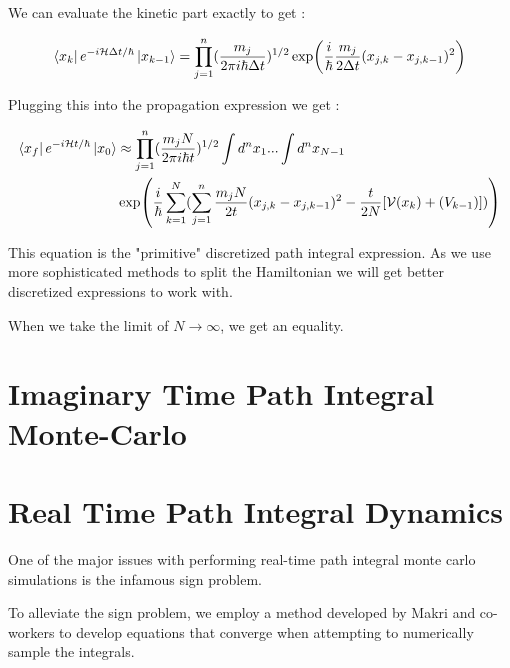 We can evaluate the kinetic part exactly to get :

\begin{equation} \label{4.x}
\bra{x_k}e^{-i\mathcal{H} \Delta t/\hbar}\ket{x_{k-1}} = \prod_{j=1}^{n} (\frac{m_j}{2\pi i \hbar \Delta t})^{1/2} \exp(\frac{i}{\hbar} \frac{m_j}{2\Delta t} (x_{j,k} - x_{j, k-1})^2)
\end{equation}

Plugging this into the propagation expression we get :

\begin{equation} \label{4.x}
    \begin{split}
        \bra{x_f} e^{-i\mathcal{H}t/\hbar} \ket{x_0} & \approx \prod_{j=1}^{n} (\frac{m_j N}{2\pi i \hbar t})^{1/2}  \int d^n x_1 ... \int d^n x_{N-1} \\ & \exp(\frac{i}{\hbar} \sum_{k=1}^{N} (\sum_{j=1}^{n} \frac{m_j N}{2t} (x_{j,k} - x_{j, k-1})^2 - \frac{t}{2N}[\mathcal{V}(x_k) + \mathcal(V_{k-1})]))
    \end{split}
\end{equation}

This equation is the "primitive" discretized path integral expression. As we use more sophisticated methods to split the Hamiltonian we will get better discretized expressions to work with.

When we take the limit of $N \to \infty$, we get an equality.  

\section{Imaginary Time Path Integral Monte-Carlo}




\section{Real Time Path Integral Dynamics}


One of the major issues with performing real-time path integral monte carlo simulations is the infamous sign problem. %

To alleviate the sign problem, we employ a method developed by Makri and co-workers  to develop equations that converge when attempting to numerically sample the integrals. 

